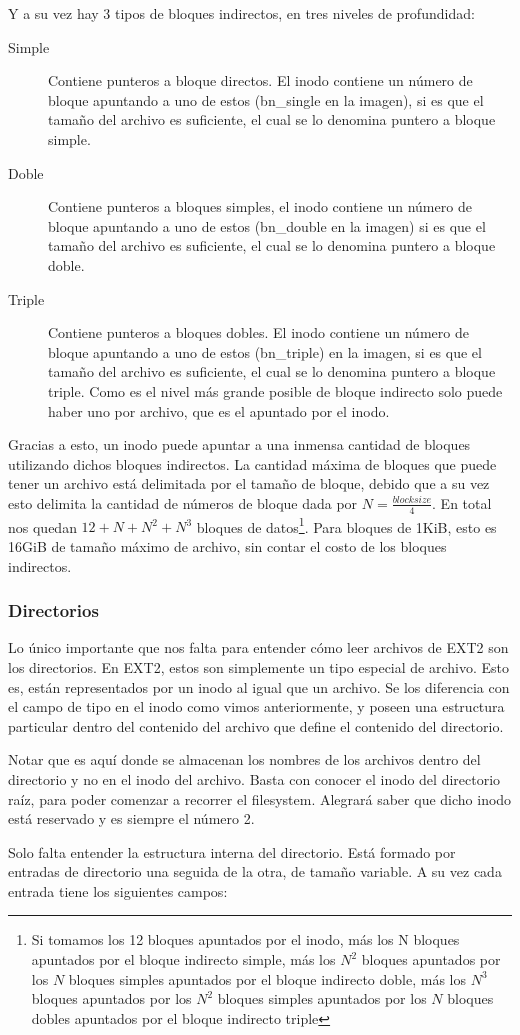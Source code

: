 Y a su vez hay 3 tipos de bloques indirectos, en tres niveles de profundidad:

\begin{description}
\item[Simple] Contiene punteros a bloque directos. El inodo contiene un número de bloque apuntando a uno de estos (bn\_single en la imagen), si es que el tamaño del archivo es suficiente, el cual se lo denomina puntero a bloque simple.
\item[Doble] Contiene punteros a bloques simples, el inodo contiene un número de bloque apuntando a uno de estos (bn\_double en la imagen) si es que el tamaño del archivo es suficiente, el cual se lo denomina puntero a bloque doble.
\item[Triple] Contiene punteros a bloques dobles. El inodo contiene un número de bloque apuntando a uno de estos (bn\_triple) en la imagen, si es que el tamaño del archivo es suficiente, el cual se lo denomina puntero a bloque triple. Como es el nivel más grande posible de bloque indirecto solo puede haber uno por archivo, que es el apuntado por el inodo.
\end{description}

Gracias a esto, un inodo puede apuntar a una inmensa cantidad de bloques utilizando dichos bloques indirectos. La cantidad máxima de bloques que puede tener un archivo está delimitada por el tamaño de bloque, debido que a su vez esto delimita la cantidad de números de bloque dada por $N = \frac{block size}{4}$. En total nos quedan $12 + N + N^2 + N^3$ bloques de datos\footnote{Si tomamos los 12 bloques apuntados por el inodo, más los N bloques apuntados por el bloque indirecto simple, más los $N^2$ bloques apuntados por los $N$ bloques simples apuntados por el bloque indirecto doble, más los $N^3$ bloques apuntados por los $N^2$ bloques simples apuntados por los $N$ bloques dobles apuntados por el bloque indirecto triple}. Para bloques de 1KiB, esto es 16GiB de tamaño máximo de archivo, sin contar el costo de los bloques indirectos. \par

\subsubsection{Directorios}

Lo único importante que nos falta para entender cómo leer archivos de EXT2 son los directorios. En EXT2, estos son simplemente un tipo especial de archivo. Esto es, están representados por un inodo al igual que un archivo. Se los diferencia con el campo de tipo en el inodo como vimos anteriormente, y poseen una estructura particular dentro del contenido del archivo que define el contenido del directorio. \par
Notar que es aquí donde se almacenan los nombres de los archivos dentro del directorio y no en el inodo del archivo. Basta con conocer el inodo del directorio raíz, para poder comenzar a recorrer el filesystem. Alegrará saber que dicho inodo está reservado y es siempre el número 2. \par
Solo falta entender la estructura interna del directorio. Está formado por entradas de directorio una seguida de la otra, de tamaño variable. A su vez cada entrada tiene los siguientes campos:

